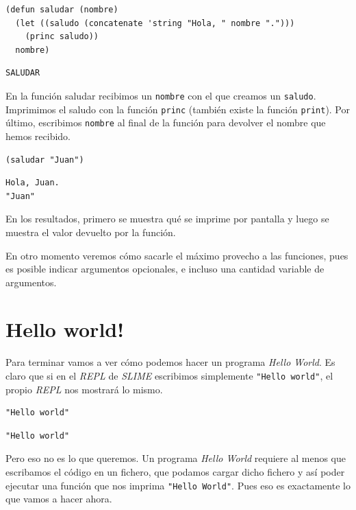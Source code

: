 \documentclass[11pt]{article}
\begin{document}
\begin{verbatim}
(defun saludar (nombre)
  (let ((saludo (concatenate 'string "Hola, " nombre ".")))
    (princ saludo))
  nombre) 
\end{verbatim}

\begin{verbatim}
SALUDAR
\end{verbatim}


En la función saludar recibimos un \texttt{nombre} con el que creamos un \texttt{saludo}. Imprimimos el saludo con la función \texttt{princ} (también existe la función \texttt{print}). Por último, escribimos \texttt{nombre} al final de la función para devolver el nombre que hemos recibido.

\begin{verbatim}
(saludar "Juan")
\end{verbatim}

\begin{verbatim}
Hola, Juan.
"Juan"
\end{verbatim}


En los resultados, primero se muestra qué se imprime por pantalla y luego se muestra el valor devuelto por la función.

En otro momento veremos cómo sacarle el máximo provecho a las funciones, pues es posible indicar argumentos opcionales, e incluso una cantidad variable de argumentos. 


\section{Hello world!}
\label{sec:org47a5ccb}

Para terminar vamos a ver cómo podemos hacer un programa \emph{Hello World}. Es claro que si en el \emph{REPL} de \emph{SLIME} escribimos simplemente \texttt{"Hello world"}, el propio \emph{REPL} nos mostrará lo mismo.

\begin{verbatim}
"Hello world"
\end{verbatim}

\begin{verbatim}
"Hello world"
\end{verbatim}


Pero eso no es lo que queremos. Un programa \emph{Hello World} requiere al menos que escribamos el código en un fichero, que podamos cargar dicho fichero y así poder ejecutar una función que nos imprima \texttt{"Hello World"}. Pues eso es exactamente lo que vamos a hacer ahora.
\end{document}
